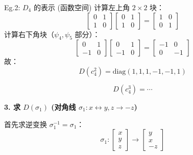 \begin{example}{Eg.2: $D_4$ 的表示 (函数空间)}
    计算左上角 $2 \times 2$ 块：
    \begin{equation}
        \begin{bmatrix} 0 & 1 \\ 1 & 0 \end{bmatrix} \begin{bmatrix} 0 & 1 \\ 1 & 0 \end{bmatrix} = \begin{bmatrix} 1 & 0 \\ 0 & 1 \end{bmatrix}
    \end{equation}
    计算右下角块（$\psi_4, \psi_5$ 部分）：
    \begin{equation}
        \begin{bmatrix} 0 & 1 \\ -1 & 0 \end{bmatrix} \begin{bmatrix} 0 & 1 \\ -1 & 0 \end{bmatrix} = \begin{bmatrix} -1 & 0 \\ 0 & -1 \end{bmatrix}
    \end{equation}
    故：
    \begin{equation}
        D(c_4^2) = \text{diag}(1, 1, 1, -1, -1, 1)
    \end{equation}

    \begin{equation}
        D(c_4^3) = \cdots
    \end{equation}

    \textbf{3. 求 $D(\sigma_1)$ (对角线 $\sigma_1: x \leftrightarrow y, z \to -z$)}
    
    首先求逆变换 $\sigma_1^{-1} = \sigma_1$：
    \begin{equation}
       \sigma_1: \begin{bmatrix} x \\ y \\ z \end{bmatrix} \to \begin{bmatrix} y \\ x \\ -z \end{bmatrix}
    \end{equation}


\end{example}

